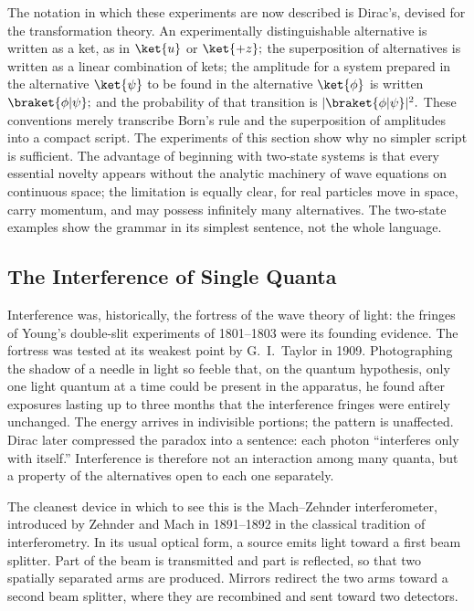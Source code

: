The notation in which these experiments are now described is Dirac's, devised for the transformation theory. An experimentally distinguishable alternative is written as a ket, as in $\ket{u}$ or $\ket{+z};$ the superposition of alternatives is written as a linear combination of kets; the amplitude for a system prepared in the alternative $\ket{\psi}$ to be found in the alternative $\ket{\phi}$ is written $\braket{\phi|\psi};$ and the probability of that transition is $|\braket{\phi|\psi}|^2.$ These conventions merely transcribe Born's rule and the superposition of amplitudes into a compact script. The experiments of this section show why no simpler script is sufficient. The advantage of beginning with two-state systems is that every essential novelty appears without the analytic machinery of wave equations on continuous space; the limitation is equally clear, for real particles move in space, carry momentum, and may possess infinitely many alternatives. The two-state examples show the grammar in its simplest sentence, not the whole language.

\subsection{The Interference of Single Quanta}
Interference was, historically, the fortress of the wave theory of light: the fringes of Young's double-slit experiments of 1801--1803 were its founding evidence. The fortress was tested at its weakest point by G.~I.~Taylor in 1909. Photographing the shadow of a needle in light so feeble that, on the quantum hypothesis, only one light quantum at a time could be present in the apparatus, he found after exposures lasting up to three months that the interference fringes were entirely unchanged. The energy arrives in indivisible portions; the pattern is unaffected. Dirac later compressed the paradox into a sentence: each photon ``interferes only with itself.'' Interference is therefore not an interaction among many quanta, but a property of the alternatives open to each one separately.

The cleanest device in which to see this is the Mach--Zehnder interferometer, introduced by Zehnder and Mach in 1891--1892 in the classical tradition of interferometry. In its usual optical form, a source emits light toward a first beam splitter. Part of the beam is transmitted and part is reflected, so that two spatially separated arms are produced. Mirrors redirect the two arms toward a second beam splitter, where they are recombined and sent toward two detectors.

